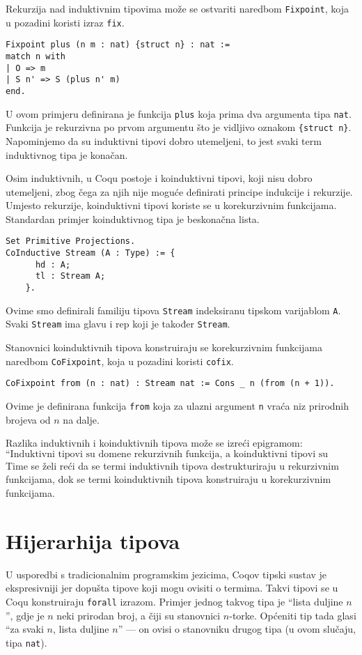 Rekurzija nad induktivnim tipovima može se ostvariti naredbom \texttt{Fixpoint}, koja u pozadini koristi izraz \texttt{fix}.
\begin{verbatim}
Fixpoint plus (n m : nat) {struct n} : nat :=
match n with
| O => m
| S n' => S (plus n' m)
end.
\end{verbatim}
U ovom primjeru definirana je funkcija \texttt{plus} koja prima dva argumenta tipa \texttt{nat}.
Funkcija je rekurzivna po prvom argumentu što je vidljivo oznakom \texttt{\{struct n\}}.
Napominjemo da su induktivni tipovi dobro utemeljeni, to jest svaki term induktivnog tipa je konačan.

Osim induktivnih, u Coqu postoje i koinduktivni tipovi, koji nisu dobro utemeljeni,
zbog čega za njih nije moguće definirati principe indukcije i rekurzije.
Umjesto rekurzije, koinduktivni tipovi koriste se u korekurzivnim funkcijama.
Standardan primjer koinduktivnog tipa je beskonačna lista.
\begin{verbatim}
Set Primitive Projections.
CoInductive Stream (A : Type) := {
      hd : A;
      tl : Stream A;
    }.
\end{verbatim}
Ovime smo definirali familiju tipova \texttt{Stream} indeksiranu tipskom varijablom \texttt{A}.
Svaki \texttt{Stream} ima glavu i rep koji je također \texttt{Stream}.

Stanovnici koinduktivnih tipova konstruiraju se korekurzivnim funkcijama naredbom \texttt{CoFixpoint}, koja u pozadini koristi \texttt{cofix}.
\begin{verbatim}
CoFixpoint from (n : nat) : Stream nat := Cons _ n (from (n + 1)).
\end{verbatim}
Ovime je definirana funkcija \texttt{from} koja za ulazni argument \texttt{n} vraća niz prirodnih brojeva od \(n\) na dalje.

Razlika induktivnih i koinduktivnih tipova može se izreći epigramom:\\
\[
  \textrm{``Induktivni tipovi su domene rekurzivnih funkcija, a koinduktivni tipovi su kodomene korekurzivnih funkcija''.}
\]
\noindent Time se želi reći da se termi induktivnih tipova destrukturiraju u rekurzivnim funkcijama,
dok se termi koinduktivnih tipova konstruiraju u korekurzivnim funkcijama.


\section{Hijerarhija tipova}\label{sec:kumul-hijer-tipova}
U usporedbi s tradicionalnim programskim jezicima, Coqov tipski sustav je ekspresivniji jer dopušta tipove koji mogu ovisiti o termima.
Takvi tipovi se u Coqu konstruiraju \texttt{forall} izrazom.
Primjer jednog takvog tipa je ``lista duljine \(n\)'', gdje je \(n\) neki prirodan broj, a čiji su stanovnici \(n\)-torke.
Općeniti tip tada glasi ``za svaki \(n\), lista duljine \(n\)'' --- on ovisi o stanovniku drugog tipa (u ovom slučaju, tipa \texttt{nat}).

